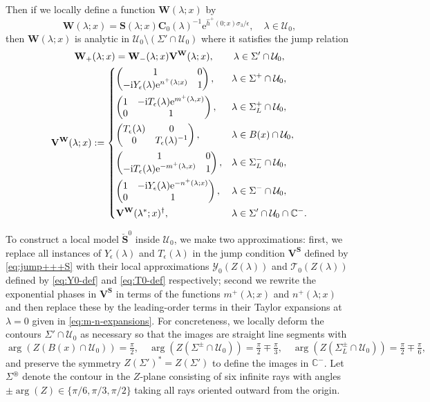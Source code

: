\documentclass[12pt]{amsart}
\numberwithin{equation}{section}
\newcommand{\ee}{\mathrm{e}}
\newcommand{\ii}{\mathrm{i}}
\newcommand{\SP}{\lambda}
\newcommand{\C}{\mathbb{C}}
\newcommand{\eps}{\epsilon}
\newcommand{\triu}[2][1]{\begin{pmatrix} #1 & #2 \\ 0 & #1 \end{pmatrix}}
\newcommand{\tril}[2][1]{\begin{pmatrix} #1 & 0 \\ #2 & #1 \end{pmatrix}}
\newcommand{\diag}[2]{\begin{pmatrix} #1 & 0 \\ 0 & #2 \end{pmatrix}}
\begin{document}
Then if we locally define a function $\mathbf{W}(\SP;x)$ by
\begin{equation}
	\mathbf{W}(\SP;x) = \mathbf{S}(\SP;x) \mathbf{C}_0(\SP)^{-1} \ee^{\hat{h}^+(0;x) \sigma_3/\epsilon},  \quad \SP \in \mathcal{U}_0,
\end{equation}
then $\mathbf{W}(\SP;x)$ is analytic in $\mathcal{U}_0 \setminus (\Sigma' \cap \mathcal{U}_0)$ where it satisfies the jump relation
\begin{equation}
\begin{gathered}
	\mathbf{W}_+(\SP;x) = \mathbf{W}_-(\SP;x) \mathbf{V^W}(\SP;x), \qquad \SP \in \Sigma' \cap \mathcal{U}_0, \\
	 \mathbf{V^W}(\SP;x) := \begin{dcases}
		\tril{-\ii Y_\eps(\SP) \ee^{n^+(\SP;x)}}, & \SP \in \Sigma^+ \cap \mathcal{U}_0, \\
		\triu{-\ii T_\eps(\SP) \ee^{m^+(\SP,x)}}, & \SP \in \Sigma^+_L \cap \mathcal{U}_0, \\	
		\diag{T_\eps(\SP)}{T_\eps(\SP)^{-1}}, & \SP \in B(x) \cap \mathcal{U}_0, \\	
		\tril{ -\ii T_\eps(\SP) \ee^{-m^+(\SP,x)}}, & \SP \in \Sigma^-_L \cap \mathcal{U}_0, \\	
		\triu{-\ii Y_\eps(\SP) \ee^{-n^+(\SP;x)}}, & \SP \in \Sigma^- \cap \mathcal{U}_0, \\
		\mathbf{V^W}(\SP^*;x)^\dagger, & \SP \in \Sigma' \cap \mathcal{U}_0 \cap \C^-.
	 \end{dcases}
\end{gathered}
\label{eq:Vw-def}
\end{equation}


To construct a local model $\breve{\mathbf{S}}^0$ inside $\mathcal{U}_0$, we make two approximations: first, we replace all instances of $Y_\eps(\SP)$ and $T_\eps(\SP)$ in the jump condition $\mathbf{V^S}$ defined by \eqref{eq:jump+++S} with their local approximations $\mathcal{Y}_0(Z(\lambda))$ and $\mathcal{T}_0(Z(\lambda))$ defined by \eqref{eq:Y0-def} and \eqref{eq:T0-def} respectively; second we rewrite the exponential phases in $\mathbf{V^S}$ in terms of the functions $m^+(\SP;x)$ and $n^+(\SP;x)$ and then replace these by the leading-order terms in their Taylor expansions at $\SP =0$ given in \eqref{eq:m-n-expansions}. 
For concreteness, we locally deform the contours $\Sigma' \cap \mathcal{U}_0$ as necessary so that the images are straight line segments with 
\begin{equation}
	\arg(Z( B(x) \cap \mathcal{U}_0)) = \tfrac{\pi}{2}, \quad
	\arg(Z( \Sigma^\pm \cap \mathcal{U}_0))= \tfrac{\pi}{2} \mp \tfrac{\pi}{3}, \quad
	\arg(Z( \Sigma_L^\pm \cap \mathcal{U}_0)) = \tfrac{\pi}{2} \mp \tfrac{\pi}{6}, 
	\label{eq:Z'-image}
\end{equation}	
and preserve the symmetry $Z(\Sigma')^* = Z(\Sigma')$ to define the images in $\C^-$. 
Let $\Sigma^\circledast$ denote the contour in the $Z$-plane consisting of six infinite rays with angles $\pm \arg(Z) \in \{\pi/6, \pi/3, \pi/2\}$ taking all rays oriented outward from the origin. 
\end{document}
